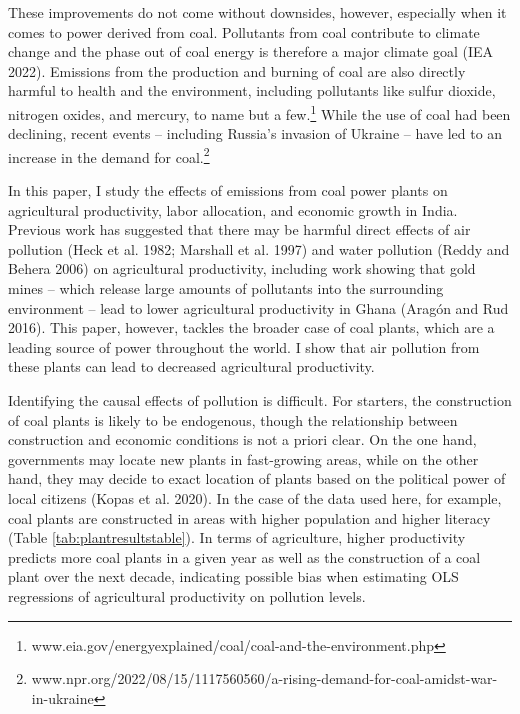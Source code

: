 \documentclass[
]{article}
\begin{document}
These improvements do not come without downsides, however, especially when it comes to power derived from coal. Pollutants from coal contribute to climate change and the phase out of coal energy is therefore a major climate goal (IEA 2022). Emissions from the production and burning of coal are also directly harmful to health and the environment, including pollutants like sulfur dioxide, nitrogen oxides, and mercury, to name but a few.\footnote{www.eia.gov/energyexplained/coal/coal-and-the-environment.php} While the use of coal had been declining, recent events -- including Russia's invasion of Ukraine -- have led to an increase in the demand for coal.\footnote{www.npr.org/2022/08/15/1117560560/a-rising-demand-for-coal-amidst-war-in-ukraine}

In this paper, I study the effects of emissions from coal power plants on agricultural productivity, labor allocation, and economic growth in India. Previous work has suggested that there may be harmful direct effects of air pollution (Heck et al. 1982; Marshall et al. 1997) and water pollution (Reddy and Behera 2006) on agricultural productivity, including work showing that gold mines -- which release large amounts of pollutants into the surrounding environment -- lead to lower agricultural productivity in Ghana (Aragón and Rud 2016). This paper, however, tackles the broader case of coal plants, which are a leading source of power throughout the world. I show that air pollution from these plants can lead to decreased agricultural productivity.

Identifying the causal effects of pollution is difficult. For starters, the construction of coal plants is likely to be endogenous, though the relationship between construction and economic conditions is not a priori clear. On the one hand, governments may locate new plants in fast-growing areas, while on the other hand, they may decide to exact location of plants based on the political power of local citizens (Kopas et al. 2020). In the case of the data used here, for example, coal plants are constructed in areas with higher population and higher literacy (Table \ref{tab:plantresultstable}). In terms of agriculture, higher productivity predicts more coal plants in a given year as well as the construction of a coal plant over the next decade, indicating possible bias when estimating OLS regressions of agricultural productivity on pollution levels.
\end{document}
